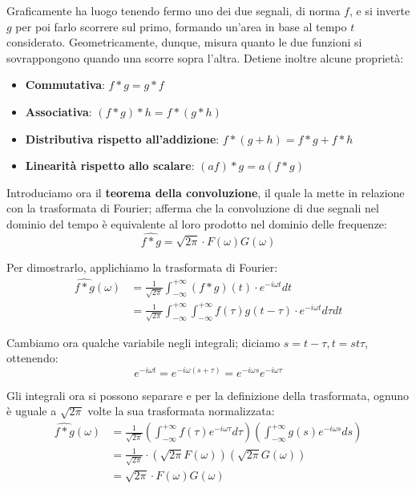 \noindent Graficamente ha luogo tenendo fermo uno dei due segnali, di norma $f$, e si inverte $g$ per poi farlo scorrere sul primo, formando un'area
in base al tempo $t$ considerato. Geometricamente, dunque, misura quanto le due funzioni si sovrappongono quando una scorre sopra l'altra. Detiene
inoltre alcune proprietà: \begin{itemize}
    \item \textbf{Commutativa}: $f*g = g*f$
    \item \textbf{Associativa}: $(f*g)*h = f*(g*h)$
    \item \textbf{Distributiva rispetto all'addizione}: $f*(g+h) = f*g + f*h$
    \item \textbf{Linearità rispetto allo scalare}: $(af)*g = a(f*g)$
\end{itemize}

\noindent Introduciamo ora il \textbf{teorema della convoluzione}, il quale la mette in relazione con la trasformata di Fourier; afferma che la
convoluzione di due segnali nel dominio del tempo è equivalente al loro prodotto nel dominio delle frequenze: \[
    \widehat{f*g} = \sqrt{2\pi}\cdot F(\omega)G(\omega)
\]

\noindent Per dimostrarlo, applichiamo la trasformata di Fourier: \begin{equation}
    \begin{split}
        \widehat{f*g}(\omega) &= \frac{1}{\sqrt{2\pi}} \int_{-\infty}^{+\infty} (f*g)(t)\cdot e^{-i\omega t} dt\\
		&= \frac{1}{\sqrt{2\pi}} \int_{-\infty}^{+\infty} \int_{-\infty}^{+\infty} f(\tau)g(t-\tau)\cdot e^{-i\omega t} d\tau dt
    \end{split}
\end{equation}

\noindent Cambiamo ora qualche variabile negli integrali; diciamo $s = t-\tau, t = st\tau$, ottenendo: \[
    e^{-i\omega t} = e^{-i\omega(s+\tau)} = e^{-i\omega s}e^{-i\omega\tau}
\]

\noindent Gli integrali ora si possono separare e per la definizione della trasformata, ognuno è uguale a $\sqrt{2\pi}$ volte la sua trasformata
normalizzata: \begin{equation}
    \begin{split}
        \widehat{f*g}(\omega) &= \frac{1}{\sqrt{2\pi}} \left(\int_{-\infty}^{+\infty} f(\tau)e^{-i\omega\tau}d\tau\right) \left(\int_{-\infty}^{+\infty}
                g(s)e^{-i\omega s}ds\right)\\
            &= \frac{1}{\sqrt{2\pi}}\cdot (\sqrt{2\pi}F(\omega)) (\sqrt{2\pi}G(\omega))\\
            &= \sqrt{2\pi}\cdot F(\omega)G(\omega)
    \end{split}
\end{equation}

